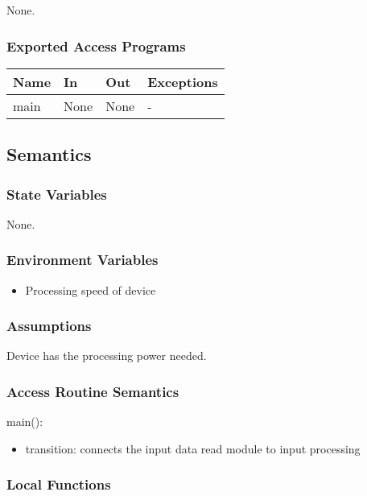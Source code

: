 \documentclass[12pt, titlepage]{article}
\begin{document}
None.

\subsubsection{Exported Access Programs}

\begin{center}
\begin{tabular}{p{2cm} p{4cm} p{4cm} p{2cm}}
\hline
\textbf{Name} & \textbf{In} & \textbf{Out} & \textbf{Exceptions} \\
\hline
main & None & None & - \\
\hline
\end{tabular}
\end{center}

\subsection{Semantics}

\subsubsection{State Variables}

None.

\subsubsection{Environment Variables}

\begin{itemize}
\item Processing speed of device
\end{itemize}

\subsubsection{Assumptions}

Device has the processing power needed.

\subsubsection{Access Routine Semantics}

\noindent main():
\begin{itemize}
\item transition:  connects the input data read module to input processing
\end{itemize}


\subsubsection{Local Functions}
\end{document}
